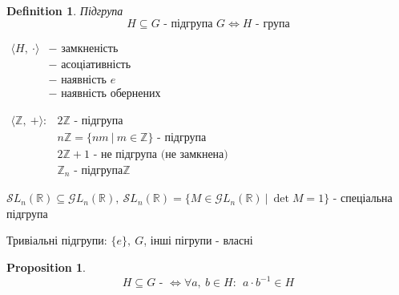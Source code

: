 \documentclass[a4paper,12pt, centered]{bookest}
\newtheorem{definition}{Definition}[section]
\newtheorem*{prop*}{Proposition}
\begin{document}
\begin{definition}Підгрупа
	$$H\subseteq G\textrm{ - підгрупа }G\Leftrightarrow H\textrm{ - група}$$
	\begin{center}
		$\begin{array}{cl}
		\langle H,\>\cdot \rangle & - \textrm{ замкненість}\\
			 & - \textrm{ асоціативність}\\
			  & - \textrm{ наявність }e\\
			   & - \textrm{ наявність обернених}
	\end{array}$
	\end{center}	
\end{definition}
\begin{example}
	$\begin{array}{cl}
		\langle\mathbb{Z},\>+\rangle: & 2\mathbb{Z}\textrm{ - підгрупа}\\
		& n\mathbb{Z}=\{nm\>|\>m\in\mathbb{Z}\}\textrm{ - підгрупа}\\
		& 2\mathbb{Z}+1\textrm{ - не підгрупа (не замкнена)}\\
		& \mathbb{Z}_n\textrm{ - підгрупа}\mathbb{Z}
	\end{array}$
\end{example}
\begin{example}
	$\mathcal{S}L_n(\mathbb{R})\subseteq\mathcal{G}L_n(\mathbb{R}),\> \mathcal{S}L_n(\mathbb{R})=\{M\in\mathcal{G}L_n(\mathbb{R})\>|\>\det M=1\}$ - спеціальна підгрупа
\end{example}
Тривіальні підгрупи: $\{e\},\>G$, інші пігрупи - власні
\begin{prop*}
	$$H\subseteq G\textrm{ - }\Leftrightarrow\forall a,\>b\in H:\>\>a\cdot  b^{-1}\in H$$
\end{prop*}
\end{document}
